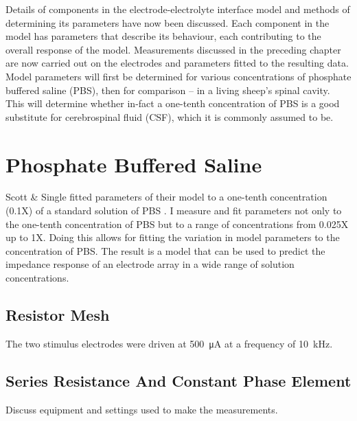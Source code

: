 
Details of components in the electrode-electrolyte interface model and methods of determining its parameters have now been discussed.
Each component in the model has parameters that describe its behaviour, each contributing to the overall response of the model.
Measurements discussed in the preceding chapter are now carried out on the electrodes and parameters fitted to the resulting data.
Model parameters will first be determined for various concentrations of phosphate buffered saline (PBS), then for comparison -- in a living sheep's spinal cavity.
This will determine whether in-fact a one-tenth concentration of PBS is a good substitute for cerebrospinal fluid (CSF), which it is commonly assumed to be.


\section{Phosphate Buffered Saline}
    Scott \& Single fitted parameters of their model to a one-tenth concentration (0.1X) of a standard solution of PBS \cite{Scott2014}.
    I measure and fit parameters not only to the one-tenth concentration of PBS but to a range of concentrations from 0.025X up to 1X.
    Doing this allows for fitting the variation in model parameters to the concentration of PBS.
    The result is a model that can be used to predict the impedance response of an electrode array in a wide range of solution concentrations.

    \subsection{Resistor Mesh}
        The two stimulus electrodes were driven at \SI{500}{\micro\ampere} at a frequency of \SI{10}{\kilo\hertz}.

    \subsection{Series Resistance And Constant Phase Element}
        Discuss equipment and settings used to make the measurements.

